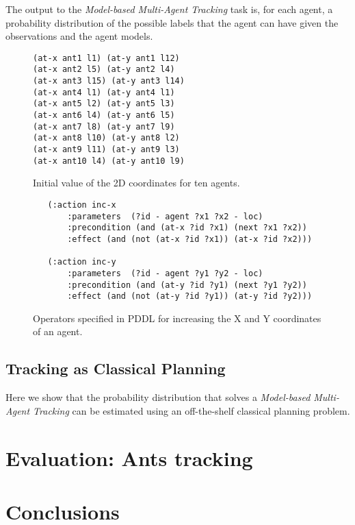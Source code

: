 \documentclass[letterpaper]{article} %
\begin{document}
The output to the {\em Model-based Multi-Agent Tracking} task is, for each agent, a probability distribution of the possible labels that the agent can have given the observations and the agent models.


\begin{figure}
\begin{scriptsize}
\begin{verbatim}
(at-x ant1 l1) (at-y ant1 l12)
(at-x ant2 l5) (at-y ant2 l4)
(at-x ant3 l15) (at-y ant3 l14)
(at-x ant4 l1) (at-y ant4 l1)	 
(at-x ant5 l2) (at-y ant5 l3)
(at-x ant6 l4) (at-y ant6 l5)
(at-x ant7 l8) (at-y ant7 l9)
(at-x ant8 l10) (at-y ant8 l2)
(at-x ant9 l11) (at-y ant9 l3)
(at-x ant10 l4) (at-y ant10 l9) 
\end{verbatim}
\end{scriptsize}
 \caption{\small Initial value of the 2D coordinates for ten agents.}
\label{fig:observation}
\end{figure}

\begin{figure}
\begin{scriptsize}
\begin{verbatim}
   (:action inc-x
       :parameters  (?id - agent ?x1 ?x2 - loc)
       :precondition (and (at-x ?id ?x1) (next ?x1 ?x2))
       :effect (and (not (at-x ?id ?x1)) (at-x ?id ?x2)))

   (:action inc-y
       :parameters  (?id - agent ?y1 ?y2 - loc)
       :precondition (and (at-y ?id ?y1) (next ?y1 ?y2))
       :effect (and (not (at-y ?id ?y1)) (at-y ?id ?y2)))
\end{verbatim}
\end{scriptsize}
 \caption{\small Operators specified in PDDL for increasing the X and Y coordinates of an agent.}
\label{fig:model}
\end{figure}



\subsection{Tracking as Classical Planning}
Here we show that the probability distribution that solves a {\em Model-based Multi-Agent Tracking} can be estimated using an off-the-shelf classical planning problem.



\section{Evaluation: Ants tracking}
\label{sec:evaluation}




\section{Conclusions}
\label{sec:conclusions}



\end{document}
